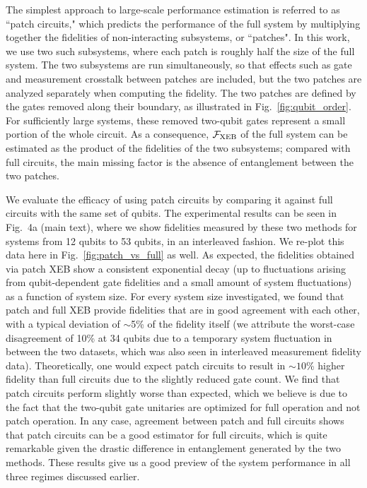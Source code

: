The simplest approach to large-scale performance estimation is referred to as ``patch circuits," which predicts the performance of the full system by multiplying together the fidelities of non-interacting subsystems, or ``patches". In this work, we use two such subsystems, where each patch is roughly half the size of the full system. The two subsystems are run simultaneously, so that effects such as gate and measurement crosstalk between patches are included, but the two patches are analyzed separately when computing the fidelity. The two patches are defined by the gates removed along their boundary, as illustrated in Fig.~\ref{fig:qubit_order}. For sufficiently large systems, these removed two-qubit gates represent a small portion of the whole circuit. As a consequence, $\mathcal{F}_{\text{XEB}}$ of the full system can be estimated as the product of the fidelities of the two subsystems; compared with full circuits, the main missing factor is the absence of entanglement between the two patches.

We evaluate the efficacy of using patch circuits by comparing it against full circuits with the same set of qubits. The experimental results can be seen in Fig.~4a (main text), where we show fidelities measured by these two methods for systems from 12 qubits to 53 qubits, in an interleaved fashion. We re-plot this data here in Fig.~\ref{fig:patch_vs_full} as well. As expected, the fidelities obtained via patch XEB show a consistent exponential decay (up to fluctuations arising from qubit-dependent gate fidelities and a small amount of system fluctuations) as a function of system size. For every system size investigated, we found that patch and full XEB provide fidelities that are in good agreement with each other, with a typical deviation of $\sim$5\% of the fidelity itself (we attribute the worst-case disagreement of 10\% at 34 qubits due to a temporary system fluctuation in between the two datasets, which was also seen in interleaved measurement fidelity data). Theoretically, one would expect patch circuits to result in $\sim10$\% higher fidelity than full circuits due to the slightly reduced gate count. We find that patch circuits perform slightly worse than expected, which we believe is due to the fact that the two-qubit gate unitaries are optimized for full operation and not patch operation. In any case, agreement between patch and full circuits shows that patch circuits can be a good estimator for full circuits, which is quite remarkable given the drastic difference in entanglement generated by the two methods. These results give us a good preview of the system performance in all three regimes discussed earlier.

